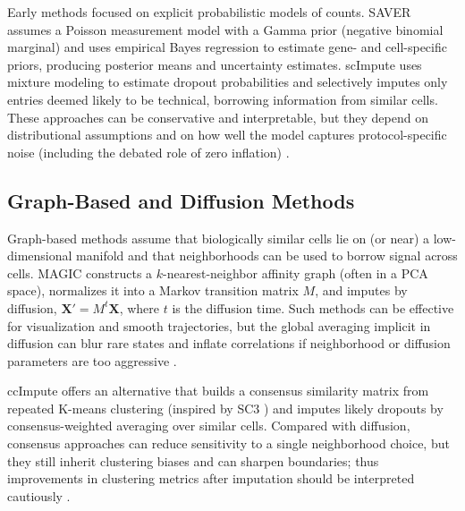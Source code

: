 \documentclass{article}
\theoremstyle{plain}
\theoremstyle{definition}
\theoremstyle{remark}
\begin{document}
Early methods focused on explicit probabilistic models of counts. SAVER \citep{Huang2018SAVER} assumes a Poisson measurement model with a Gamma prior (negative binomial marginal) and uses empirical Bayes regression to estimate gene- and cell-specific priors, producing posterior means and uncertainty estimates. scImpute \citep{Li2018scImpute} uses mixture modeling to estimate dropout probabilities and selectively imputes only entries deemed likely to be technical, borrowing information from similar cells. These approaches can be conservative and interpretable, but they depend on distributional assumptions and on how well the model captures protocol-specific noise (including the debated role of zero inflation) \citep{Svensson2020NotZeroInflated, Jiang2022ZeroInflationReview}.

\subsection{Graph-Based and Diffusion Methods}
Graph-based methods assume that biologically similar cells lie on (or near) a
low-dimensional manifold and that neighborhoods can be used to borrow signal
across cells. MAGIC \citep{vanDijk2018MAGIC} constructs a $k$-nearest-neighbor
affinity graph (often in a PCA space), normalizes it into a Markov transition
matrix $M$, and imputes by diffusion,
$\mathbf{X}' = M^{t}\mathbf{X}$, where $t$ is the diffusion time. Such methods
can be effective for visualization and smooth trajectories, but the global
averaging implicit in diffusion can blur rare states and inflate correlations
if neighborhood or diffusion parameters are too aggressive
\citep{Huang2018SAVER, Hou2020ImputationBenchmark, Linderman2022ZeroPreserving}.

ccImpute \citep{Malec2022ccImpute} offers an alternative
that builds a consensus similarity matrix from repeated K-means clustering
(inspired by SC3 \citep{Kiselev2017SC3}) and imputes likely dropouts by
consensus-weighted averaging over similar cells. Compared with diffusion,
consensus approaches can reduce sensitivity to a single neighborhood choice,
but they still inherit clustering biases and can sharpen boundaries; thus
improvements in clustering metrics after imputation should be interpreted
cautiously \citep{Hou2020ImputationBenchmark}.
\end{document}

